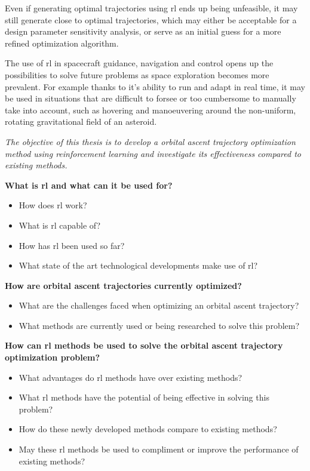 Even if generating optimal trajectories using \acrshort{rl} ends up being unfeasible, it may still generate close to optimal trajectories, which may either be acceptable for a design parameter sensitivity analysis, or serve as an initial guess for a more refined optimization algorithm.

The use of \gls{rl} in spacecraft guidance, navigation and control opens up the possibilities to solve future problems as space exploration becomes more prevalent. For example thanks to it's ability to run and adapt in real time, it may be used in situations that are difficult to forsee or too cumbersome to manually take into account, such as hovering and manoeuvering around the non-uniform, rotating gravitational field of an asteroid.

\emph{The objective of this thesis is to develop a orbital ascent trajectory optimization method using reinforcement learning and investigate its effectiveness compared to existing methods.}

\textbf{What is \acrlong{rl} and what can it be used for?}
\begin{itemize}
  \item How does \acrshort{rl} work?
  \item What is \acrshort{rl} capable of?
  \item How has \acrshort{rl} been used so far?
  \item What state of the art technological developments make use of \acrshort{rl}?  
\end{itemize}
  
\textbf{How are orbital ascent trajectories currently optimized?}
\begin{itemize}
  \item What are the challenges faced when optimizing an orbital ascent trajectory?
  \item What methods are currently used or being researched to solve this problem?
\end{itemize}

\textbf{How can \acrlong{rl} methods be used to solve the orbital ascent trajectory optimization problem?}
\begin{itemize}
  \item What advantages do \acrshort{rl} methods have over existing methods?
  \item What \acrshort{rl} methods have the potential of being effective in solving this problem?
  \item How do these newly developed methods compare to existing methods?
  \item May these \acrshort{rl} methods be used to compliment or improve the performance of existing methods?
\end{itemize}
